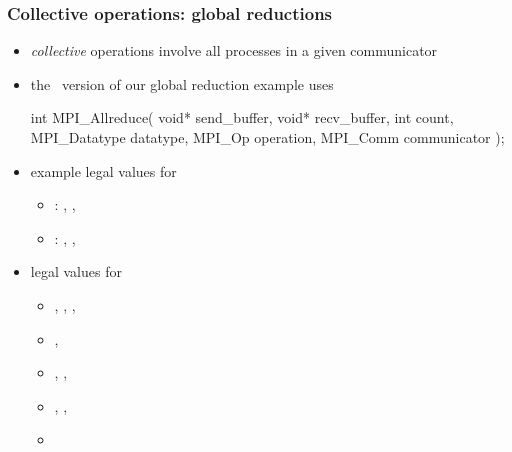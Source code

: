 \begin{frame}[fragile]
%
  \frametitle{Collective operations: global reductions}
%
  \begin{itemize}
%
  \item {\em collective} operations involve all processes in a given communicator
%
  \item the \mpi\ version of our global reduction example uses
    \begin{C}
int MPI_Allreduce(
        void* send_buffer, void* recv_buffer,
        int count, MPI_Datatype datatype, MPI_Op operation,
        MPI_Comm communicator
        );
   \end{C}
%
  \item example legal values for 
    \begin{itemize}
    \item \cc: , ,  
    \item \fortran: , ,
    \end{itemize}
%
  \item legal values for 
    \begin{itemize}
    \item {}, , ,
    \item {}, 
    \item {}, , 
    \item {}, , 
    \item {}
    \end{itemize}
%
  \end{itemize}
%
\end{frame}

